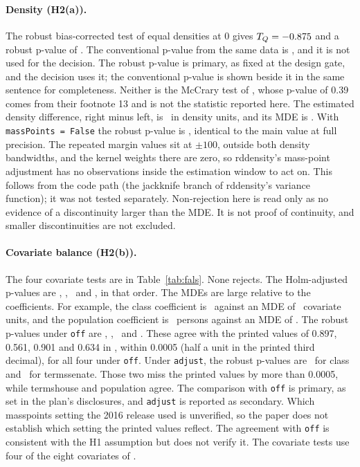 \documentclass[11pt]{article}
\begin{document}
\paragraph{Density (H2(a)).}
The robust bias-corrected test of equal densities at 0 gives $T_Q=-0.875$ and a robust p-value of \RdDensityP. The conventional p-value from the same data is \RdDensityPConv, and it is not used for the decision. The robust p-value is primary, as fixed at the design gate, and the decision uses it; the conventional p-value is shown beside it in the same sentence for completeness. Neither is the McCrary test of \citet{cattaneo2015randomization}, whose p-value of 0.39 comes from their footnote 13 and is not the statistic reported here. The estimated density difference, right minus left, is \RdDensityDiff\ in density units, and its MDE is \RdDensityMde. With \texttt{massPoints = False} the robust p-value is \RdDensityPNomass, identical to the main value at full precision. The repeated margin values sit at $\pm 100$, outside both density bandwidths, and the kernel weights there are zero, so rddensity's mass-point adjustment has no observations inside the estimation window to act on. This follows from the code path (the jackknife branch of rddensity's variance function); it was not tested separately. Non-rejection here is read only as no evidence of a discontinuity larger than the MDE. It is not proof of continuity, and smaller discontinuities are not excluded.

\paragraph{Covariate balance (H2(b)).}
The four covariate tests are in Table~\ref{tab:fals}. None rejects. The Holm-adjusted p-values are \RdCovClassHolm, \RdCovTermshouseHolm, \RdCovTermssenateHolm\ and \RdCovPopulationHolm, in that order. The MDEs are large relative to the coefficients. For example, the class coefficient is \RdCovClassCoef\ against an MDE of \RdCovClassMde\ covariate units, and the population coefficient is \RdCovPopulationCoef\ persons against an MDE of \RdCovPopulationMde. The robust p-values under \texttt{off} are \RdCovClassP, \RdCovTermshouseP, \RdCovTermssenateP\ and \RdCovPopulationP. These agree with the printed values of 0.897, 0.561, 0.901 and 0.634 in \citet[p.~397]{calonico2017rdrobust}, within 0.0005 (half a unit in the printed third decimal), for all four under \texttt{off}. Under \texttt{adjust}, the robust p-values are \RdCovClassAdjP\ for class and \RdCovTermssenateAdjP\ for termssenate. Those two miss the printed values by more than 0.0005, while termshouse and population agree. The comparison with \texttt{off} is primary, as set in the plan's disclosures, and \texttt{adjust} is reported as secondary. Which masspoints setting the 2016 release used is unverified, so the paper does not establish which setting the printed values reflect. The agreement with \texttt{off} is consistent with the H1 assumption but does not verify it. The covariate tests use four of the eight covariates of \citet{cattaneo2015randomization}.
\end{document}
